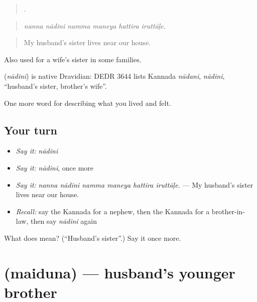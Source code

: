 \begin{quote}
     .
\end{quote}

\begin{quote}
\emph{nanna nādini namma maneya hattira iruttāḷe.}
\end{quote}

\begin{quote}
My husband's sister lives near our house.
\end{quote}

Also used for a wife's sister in some families.

\begin{cousinweb}
\textbf{} (\emph{nādini}) is native Dravidian: DEDR 3644 lists Kannada \emph{nādani}, \emph{nādini}, \textquotedblleft{}husband's sister, brother's wife\textquotedblright{}.
\end{cousinweb}

\begin{grammarlens}[title={What you've built}]
One more word for describing what you lived and felt.
\end{grammarlens}

\subsection*{Your turn}
\begin{itemize}
\raggedright
  \item \emph{Say it:} \emph{nādini}
  \item \emph{Say it:} \emph{nādini}, once more
  \item \emph{Say it:} \emph{nanna nādini namma maneya hattira iruttāḷe.} — My husband's sister lives near our house.
  \item \emph{Recall:} say the Kannada for a nephew, then the Kannada for a brother-in-law, then say \emph{nādini} again
\end{itemize}

\begin{tcolorbox}[breakable,colback=teal!4,colframe=teal!35!black,title={Before you move on}]
What does  mean? (\textquotedblleft{}Husband's sister\textquotedblright{}.) Say it once more.
\end{tcolorbox}
\section[\texorpdfstring{\kn{ಮೈದುನ} (maiduna)}{ಮೈದುನ (maiduna)}]{ (maiduna) — husband's younger brother}

